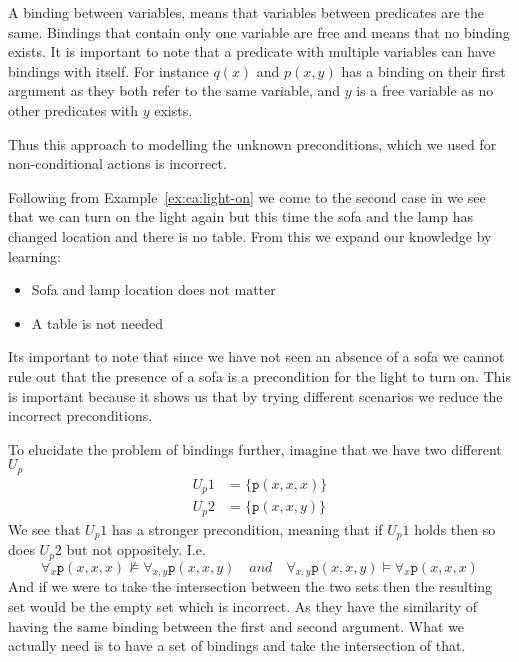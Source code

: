 \documentclass[\master/Master.tex]{subfiles}
\begin{document}
\begin{definition}[Binding]\label{def:ca:binding}
    A binding between variables, means that variables between predicates are the same.
	Bindings that contain only one variable are free and means that no binding exists.
	It is important to note that a predicate with multiple variables can have bindings with itself.
	For instance $q(x)$ and $p(x,y)$ has a binding on their first argument as they both refer to the same variable, and $y$ is a free variable as no other predicates with $y$ exists.
\end{definition}
Thus this approach to modelling the unknown preconditions, which we used for non-conditional actions is incorrect.

\begin{example}\label{ex:ca:light-on-2}
    Following from Example~\ref{ex:ca:light-on} we come to the second case in 
    we see that we can turn on the light again but this time the sofa and the lamp has changed location and
    there is no table. From this we expand our knowledge by learning:
    \begin{itemize}
        \item Sofa and lamp location does not matter
        \item A table is not needed
    \end{itemize}
    Its important to note that since we have not seen an absence of a sofa we cannot rule out that the presence of a sofa is a precondition for the light to turn on. This is important because it shows us that by trying different scenarios we reduce the incorrect preconditions.
\end{example}

\begin{example}\label{ex:ca:nonbinding-intersection-model}
    To elucidate the problem of bindings further, imagine that we have two different $U_p$
    \begin{align*}
        U_p1 &= \{ \texttt{p}(x, x, x) \} \\
        U_p2 &= \{ \texttt{p}(x, x, y) \}
    \end{align*}
    We see that $U_p1$ has a stronger precondition, meaning that if $U_p1$ holds then so does $U_p2$ but not oppositely. I.e.\ 
    \begin{equation*}
    \forall_{x} \texttt{p}(x, x, x) \nvDash \forall_{x, y} \texttt{p}(x, x, y)  \quad and \quad
     \forall_{x, y} \texttt{p}(x, x, y) \vDash \forall_{x} \texttt{p}(x, x, x) 
    \end{equation*}
    And if we were to take the intersection between the two sets then the resulting set would be the empty set which is incorrect. As they have the similarity of having the same binding between the first and second argument. What we actually need is to have a set of bindings and take the intersection of that.
\end{example}
\end{document}
